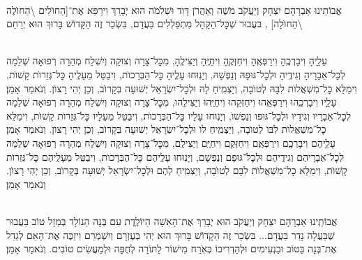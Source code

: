 \documentclass[twoside, openany, parskip=half, 11pt]{book}
\begin{document}
\begin{small}

\\
אֲבוֹתֵינוּ אַבְרָהָם יִצְחָק וְיַעֲקֹב מֹשֶׁה וְאַהֲרֹן דָּוִד וּשְׁלֹמֹה הוּא יְבָרֵךְ וִירַפֵּא אֶת־[הַחוׂלִים \textbackslash הַחוׂלֶה \textbackslash הַחוׂלָה]
,
בּעֲבוּר שְׁכׇּל־הַקָּהָל מִתְפַּלְלִים בַּעֲדָם, בִּשְׂכַר זֶה
הַקָּדוֹשׁ בָּרוּךְ הוּא יְרַחֵם
\setcolumnwidth{1.4in,1.4in,1.4in}
\begin{paracol}{3}
\\
עָלֵָיהָ וִיבָרְכֶֽהָ וִירַפְּאֶֽהָ וִיחַזְּקֶֽהָ וִיחַיֶּֽהָ וְיַצִּילֶֽהָ, מִכׇּל־צָרָה וְצוּקָה וְיִשְׁלַח מְהֵרָה רְפוּאָה שְׁלֵמָה לְכׇל־אֵבָרָיהָ וְגִידֶֽיהָ וּלְכׇל־גּוּפָהּ וְנַפְשָׁהּ, וְיָנֽוּחוּ עָלְֶיהָ כׇּל־הַבְּרָכוׂת, וִיבַטֵּל מֵעָלֶֽיהָ כׇּל־גְּזֵרוׂת קָשׁוׂת, וִימַלֵּא כׇל־מִשְׁאֲלוׂת לִבָּהּ לְטוׂבָה, וְיַצְמִֽיחַ לָהּ וּלְכׇל־יִשְׂרָאֵל יְשׁוּעָה בְּקָרוׂב, וְכֵן יְהִי רָצוׂן. וְנֹאמַר אָמֵן׃
\switchcolumn
{}\\
עָלֵָיו וִיבָרְכֵֽהוּ וִירַפְּאֵֽהוּ וִיחַזְּקֵהוּ וִיחַיֵּֽהוּ וְיַצִּילֵֽהוּ, מִכׇּל־צָרָה וְצוּקָה וְיִשְׁלַח מְהֵרָה רְפוּאָה שְׁלֵמָה לְכׇל־אֵבָרָיו וְגִידָיו וּלְכׇל־גּוּפוּ וְנַפְשׁוׂ, וְיָנֽוּחוּ עָלָיו כׇּל־הַבְּרָכוׂת, וִיבַטֵּל מֵעָלָיו כׇּל־גְּזֵרוׂת קָשׁוׂת, וִימַלֵּא כׇל־מִשְׁאֲלוׂת לִבּוׂ לְטוׂבָה, וְיַצְמִֽיחַ לוׂ וּלְכׇל־יִשְׂרָאֵל יְשׁוּעָה בְּקָרוׂב, וְכֵן יְהִי רָצוׂן. וְנֹאמַר אָמֵן׃
\switchcolumn
{}\\
עָלֵָיהֶם וִיבָרְכְֶם וִירַפְּאֶֽם וִיחַזְּקֶֽם וִיחַיֶּֽם וְיַצִּילֶֽם, מִכׇּל־צָרָה וְצוּקָה וְיִשְׁלַח מְהֵרָה רְפוּאָה שְׁלֵמָה לְכׇל־אֵבָרָיהֶם וְגִידֶֽיהֶם וּלְכׇל־גּוּפָם וְנַפְשָׁם, וְיָנֽוּחוּ עָלְֶיהֶם כׇּל־הַבְּרָכוׂת, וִיבַטֵּל מֵעָלֶֽיהֶם כׇּל־גְּזֵרוׂת קָשׁוׂת, וִימַלֵּא כׇל־מִשְׁאֲלוׂת לִבָּם לְטוׂבָה, וְיַצְמִֽיחַ לְהֶם וּלְכׇל־יִשְׂרָאֵל יְשׁוּעָה בְּקָרוׂב, וְכֵן יְהִי רָצוׂן. וְנֹאמַר אָמֵן׃
\end{paracol}

\vspace{\baselineskip}

\\
אֲבוֹתֵֽינוּ אַבְרָהָם יִצְחָק וְיַעֲקֹב הוּא יְבָרֵךְ אֶת־הָאִשָׁה הַיוֹלֶֽדֶת
עִם בְּנָה הַנוֹלָד בְּמַזָל טוֹב בַּעֲבוּר שֶׁבַּעֲלָה נָדַר בַּעֲדָם... בִּשְׂכַר זֶה הַקָדוֹשׁ בָּרוּךְ הוּא יְהִי בְּעֶזְרָם וְיִשְׁמְרֵם וִיזַכֶּה אֶת־הָאֵם לְגַדֵל אֶת־בְּנָה בַּטוֹב וּבַנְעִימִים וּלְהַדְרִיכוֹ בְּאֹֽרַח מִישׁוֹר לַתּוֹרָה לְחֻפָּה וּלְמַעֲשִׂים טוֹבִים. וְנֹאמַר אָמֵן׃


\end{small}
\end{document}
